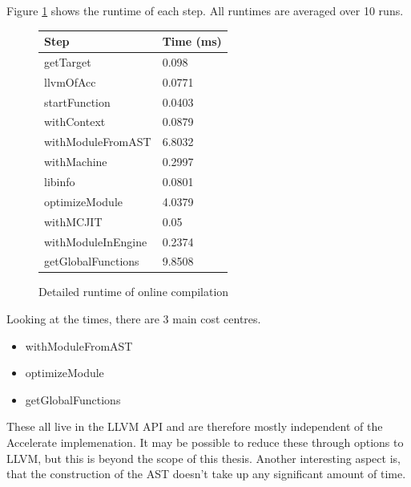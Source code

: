\documentclass[a4paper,bibliography=totocnumbered,parskip,headsepline]{scrbook}
\begin{document}
Figure \ref{fig:compile} shows the runtime of each step.
All runtimes are averaged over 10 runs.

\begin{figure}
    \centering
\begin{tabular}{ll}
Step             & Time (ms)   \\ \hline
getTarget        & 0.098  \\
llvmOfAcc              & 0.0771 \\
startFunction    & 0.0403 \\
withContext      & 0.0879 \\
withModuleFromAST       & 6.8032 \\
withMachine      & 0.2997 \\
libinfo          & 0.0801 \\
optimizeModule   & 4.0379 \\
withMCJIT        & 0.05   \\
withModuleInEngine   & 0.2374 \\
getGlobalFunctions & 9.8508 \\
\end{tabular}
\caption{Detailed runtime of online compilation}
    \label{fig:compile}
\end{figure}

Looking at the times, there are 3 main cost centres.

\begin{itemize}[noitemsep]
 \item withModuleFromAST
 \item optimizeModule
 \item getGlobalFunctions
\end{itemize}

These all live in the LLVM API and are therefore mostly independent of the Accelerate implemenation.
It may be possible to reduce these through options to LLVM, but this is beyond the scope of this thesis.
Another interesting aspect is, that the construction of the AST doesn't take up any significant amount of time.
\end{document}
